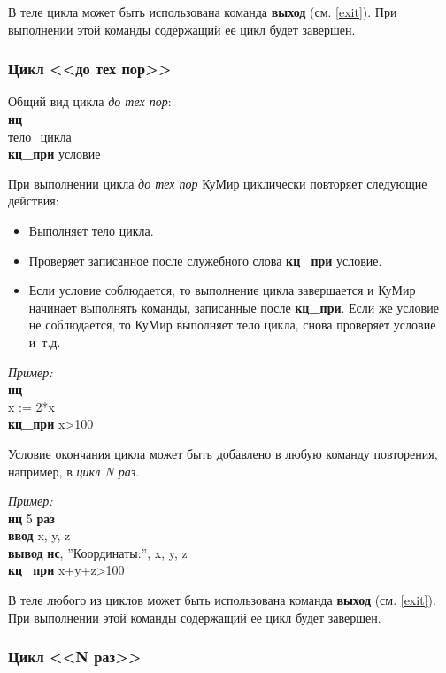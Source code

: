 	В теле цикла может быть использована команда \textbf{выход} (см. \ref{exit}). При выполнении этой команды содержащий ее цикл будет завершен. 


\subsubsection[Цикл ''до тех пор'']{Цикл <<до тех пор>>}

Общий вид цикла \emph{до тех пор}:\\
{\sffamily
\textbf{нц}\\
\otstup тело\_цикла\\
\textbf{кц\_при} условие
}

При выполнении цикла \emph{до тех пор} КуМир циклически повторяет следующие действия:
\begin{itemize}
\item Выполняет тело цикла.
\item Проверяет записанное после служебного слова \textbf{кц\_при} условие.
\item Если условие соблюдается, то выполнение цикла завершается и КуМир начинает выполнять команды, записанные после \textbf{кц\_при}. Если же условие не соблюдается, то КуМир выполняет тело цикла, снова проверяет условие и~т.д.
\end{itemize}

\emph{Пример:}\\
{\sffamily
\textbf{нц}\\
\otstup x := 2*x\\
\textbf{кц\_при} x>100
}

Условие окончания цикла может быть добавлено в любую команду повторения, например, в \emph{цикл N раз}.

\emph{Пример:}\\
{\sffamily
\textbf{нц} 5 \textbf{раз}\\
\otstup \textbf{ввод} x, y, z\\
\otstup \textbf{вывод} \textbf{нс}, ''Координаты:'', x, y, z\\
\textbf{кц\_при} x+y+z>100
}

В теле любого из циклов может быть использована команда \textbf{выход} (см. \ref{exit}). При выполнении этой команды содержащий ее цикл будет завершен.

\subsubsection[Цикл ''N раз'']{Цикл <<N раз>>}

